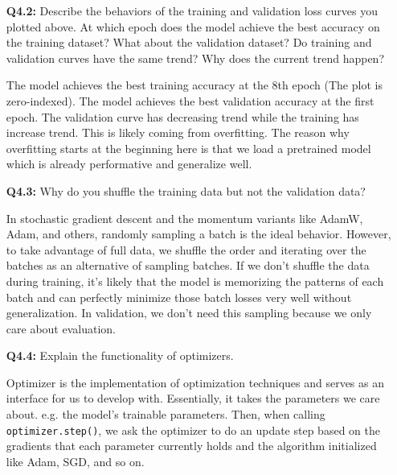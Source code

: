 \documentclass{article}
\newenvironment{solution}{\color{blue}}{}
\begin{document}
\begin{itemize}
\begin{itemize}
    \item[\textbf{Q4.2:}] Describe the behaviors of the training and validation loss curves you plotted above. At which epoch does the model achieve the best accuracy on the training dataset? What about the validation dataset? Do training and validation curves have the same trend? Why does the current trend happen?
    
    \begin{solution}
      The model achieves the best training accuracy at the 8th epoch (The plot is zero-indexed). The model achieves the best validation accuracy at the first epoch. The validation curve has decreasing trend while the training has increase trend. This is likely coming from overfitting. The reason why overfitting starts at the beginning here is that we load a pretrained model which is already performative and generalize well.
    \end{solution}
    
    \item[\textbf{Q4.3:}] Why do you shuffle the training data but not the validation data?
    
    \begin{solution}
      In stochastic gradient descent and the momentum variants like AdamW, Adam, and others, randomly sampling a batch is the ideal behavior. However, to take advantage of full data, we shuffle the order and iterating over the batches as an alternative of sampling batches. If we don't shuffle the data during training, it's likely that the model is memorizing the patterns of each batch and can perfectly minimize those batch losses very well without generalization. In validation, we don't need this sampling because we only care about evaluation.
    \end{solution}
    
    \item[\textbf{Q4.4:}] Explain the functionality of optimizers.
    
    \begin{solution}
      Optimizer is the implementation of optimization techniques and serves as an interface for us to develop with. Essentially, it takes the parameters we care about. e.g. the model's trainable parameters. Then, when calling \texttt{optimizer.step()}, we ask the optimizer to do an update step based on the gradients that each parameter currently holds and the algorithm initialized like Adam, SGD, and so on.
    \end{solution}
    

\end{itemize}
\end{itemize}
\end{document}
